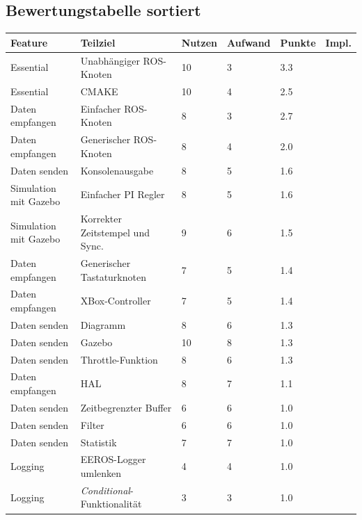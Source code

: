 \subsection{Bewertungstabelle sortiert}
\label{BewertungstabelleSortiert}
\begin{tabular}
  { l								| l			 								l			 l			 l 		l}
  \textbf{Feature}					& \textbf{Teilziel}	& \textbf{Nutzen}	& \textbf{Aufwand}	& \textbf{Punkte}	& \textbf{Impl.}	\\ \hline
  
  Essential							& Unabhängiger ROS-Knoten				& 10		& 3			& 3.3	&\cmark	\\
  Essential							& CMAKE									& 10		& 4			& 2.5	&\cmark	\\ 
  Daten empfangen					& Einfacher ROS-Knoten					& 8			& 3			& 2.7	&\cmark	\\
  Daten empfangen					& Generischer ROS-Knoten				& 8			& 4			& 2.0	&\cmark	\\
  Daten senden						& Konsolenausgabe 						& 8			& 5			& 1.6	&\cmark	\\
  Simulation mit Gazebo				& Einfacher PI Regler					& 8			& 5			& 1.6	&\cmark	\\ 
  Simulation mit Gazebo				& Korrekter Zeitstempel und Sync.		& 9			& 6			& 1.5	&\cmark	\\
  Daten empfangen					& Generischer Tastaturknoten			& 7			& 5			& 1.4	&\cmark	\\ 
  Daten empfangen					& XBox-Controller						& 7			& 5			& 1.4	&\xmark	\\ 
  Daten senden						& Diagramm								& 8			& 6			& 1.3	&\cmark	\\
  Daten senden						& Gazebo								& 10		& 8			& 1.3	&\cmark	\\
  Daten senden						& Throttle-Funktion						& 8			& 6			& 1.3	&\xmark	\\
  Daten empfangen					& HAL									& 8			& 7			& 1.1	&\cmark	\\
  Daten senden						& Zeitbegrenzter Buffer					& 6			& 6			& 1.0	&\xmark	\\
  Daten senden						& Filter								& 6			& 6			& 1.0	&\xmark	\\
  Daten senden						& Statistik								& 7			& 7			& 1.0	&\xmark	\\ 
  Logging 							& EEROS-Logger umlenken					& 4			& 4			& 1.0	&\xmark	\\
  Logging							& \textit{Conditional}-Funktionalität 	& 3			& 3			& 1.0	&\xmark	\\

\end{tabular}
